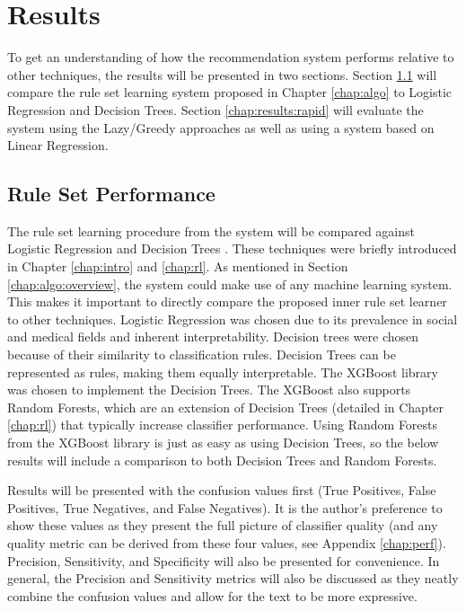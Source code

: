 \chapter{Results} \label{chap:results}

To get an understanding of how the \Abb recommendation system performs relative to other techniques, the results will be presented in two sections. Section \ref{chap:results:sets} will compare the rule set learning system proposed in Chapter \ref{chap:algo} to Logistic Regression and Decision Trees. Section \ref{chap:results:rapid} will evaluate the \Abb system using the Lazy/Greedy approaches as well as using a \Abb system based on Linear Regression.


\section{Rule Set Performance}\label{chap:results:sets}

The rule set learning procedure from the \Abb system will be compared against Logistic Regression  \cite{hastie2009elements} and Decision Trees \cite{chen2016xgboost}. These techniques were briefly introduced in Chapter \ref{chap:intro} and \ref{chap:rl}. As mentioned in Section \ref{chap:algo:overview}, the \Abb system could make use of any machine learning system. This makes it important to directly compare the proposed inner rule set learner to other techniques.
Logistic Regression was chosen due to its prevalence in social and medical fields \cite{allegheny2019homeless} \cite{hong2018applications} \cite{toros2019early} and inherent interpretability.
Decision trees were chosen because of their similarity to classification rules. Decision Trees can be represented as rules, making them equally interpretable. The XGBoost library \cite{chen2016xgboost} was chosen to implement the Decision Trees. The XGBoost also supports Random Forests, which are an extension of Decision Trees (detailed in Chapter \ref{chap:rl}) that typically increase classifier performance. Using Random Forests from the XGBoost library is just as easy as using Decision Trees, so the below results will include a comparison to both Decision Trees and Random Forests.

Results will be presented with the confusion values first (True Positives, False Positives, True Negatives, and False Negatives). It is the author's preference to show these values as they present the full picture of classifier quality (and any quality metric can be derived from these four values, see Appendix \ref{chap:perf}). Precision, Sensitivity, and Specificity will also be presented for convenience. In general, the Precision and Sensitivity metrics will also be discussed as they neatly combine the confusion values and allow for the text to be more expressive.


